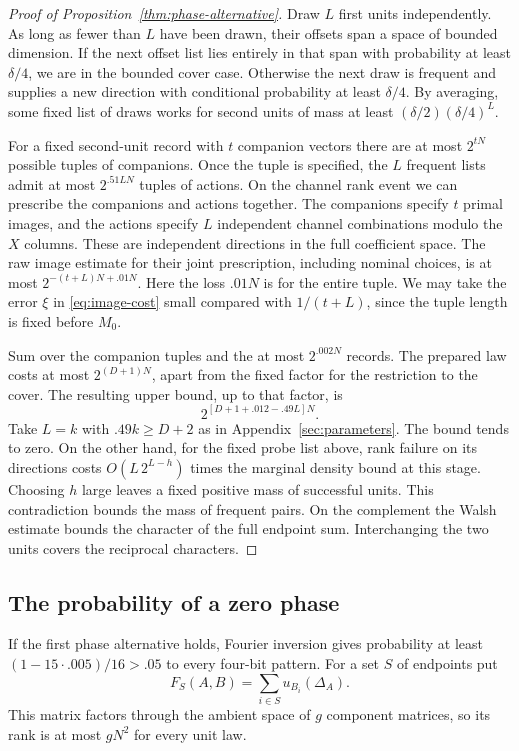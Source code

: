 \begin{proof}[Proof of Proposition~\ref{thm:phase-alternative}]
Draw \(L\) first units independently. As long as fewer than \(L\)
have been drawn, their offsets span a space of bounded dimension.
If the next offset list lies entirely in that span with probability at
least \(\delta/4\), we are in the bounded cover case. Otherwise the next
draw is frequent and supplies a new direction with conditional
probability at least \(\delta/4\). By averaging, some fixed list of
draws works for second units of mass at least
\((\delta/2)(\delta/4)^L\).

For a fixed second-unit record with \(t\) companion vectors there
are at most \(2^{tN}\) possible tuples of companions. Once the tuple
is specified, the \(L\) frequent lists admit at most \(2^{.51LN}\)
tuples of actions. On the channel rank event we can prescribe the
companions and actions together. The companions specify \(t\) primal
images, and the actions specify \(L\) independent channel combinations
modulo the \(X\) columns. These are independent directions in the full
coefficient space. The raw image estimate for their joint prescription,
including nominal choices, is at most \(2^{-(t+L)N+.01N}\). Here the
loss \(.01N\) is for the entire tuple. We may take the error \(\xi\)
in \eqref{eq:image-cost} small compared with \(1/(t+L)\), since the
tuple length is fixed before \(M_0\).

Sum over the companion tuples and the at most \(2^{.002N}\) records.
The prepared law costs at most \(2^{(D+1)N}\), apart from the fixed
factor for the restriction to the cover. The resulting upper bound,
up to that factor, is
\[
 2^{[D+1+.012-.49L]N}.
\]
Take \(L=k\) with \(.49k\ge D+2\) as in Appendix~\ref{sec:parameters}.
The bound tends to zero. On the other hand, for the fixed probe list
above, rank failure on its directions costs \(O(L\,2^{L-h})\) times
the marginal density bound at this stage. Choosing \(h\) large leaves
a fixed positive mass of successful units. This contradiction bounds
the mass of frequent pairs. On the complement the Walsh estimate
bounds the character of the full endpoint sum. Interchanging the two
units covers the reciprocal characters.

\end{proof}

\subsection{The probability of a zero phase}

If the first phase alternative holds, Fourier inversion gives probability
at least \((1-15\cdot.005)/16>.05\) to every four-bit pattern.
For a set \(S\) of endpoints put
\[
 F_S(A,B)=\sum_{i\in S}u_{B_i}(\Delta_A).
\]
This matrix factors through the ambient space of \(g\) component
matrices, so its rank is at most \(gN^2\) for every unit law.

